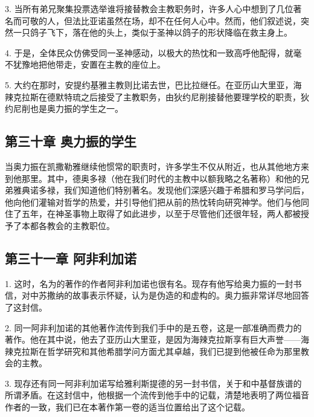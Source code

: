 3. 当所有弟兄聚集投票选举谁将接替教会主教职务时，许多人心中想到了几位著名而可敬的人，但法比亚诺虽然在场，却不在任何人心中。然而，他们叙述说，突然一只鸽子飞下，落在他的头上，类似于圣神以鸽子的形状降临在救主身上。\par

4. 于是，全体民众仿佛受同一圣神感动，以极大的热忱和一致高呼他配得，就毫不犹豫地把他带走，安置在主教的座位上。\par

5. 大约在那时，安提约基雅主教则比诺去世，巴比拉继任。在亚历山大里亚，海辣克拉斯在德默特琉之后接受了主教职务，由狄约尼削接替他要理学校的职责，狄约尼削也是奥力振的学生之一。\par


\subsection{第三十章  奥力振的学生}

当奥力振在凯撒勒雅继续他惯常的职责时，许多学生不仅从附近，也从其他地方来到他那里。其中，德奥多禄（他在我们时代的主教中以额我略之名著称）和他的兄弟雅典诺多禄，我们知道他们特别著名。发现他们深感兴趣于希腊和罗马学问后，他向他们灌输对哲学的热爱，并引导他们把从前的热忱转向研究神学。他们与他同住了五年，在神圣事物上取得了如此进步，以至于尽管他们还很年轻，两人都被授予了本都各教会的主教职位。\par


\subsection{第三十一章  阿非利加诺}

1. 这时，名为的著作的作者阿非利加诺也很有名。现存有他写给奥力振的一封书信，对中苏撒纳的故事表示怀疑，认为是伪造的和虚构的。奥力振非常详尽地回答了这封信。\par

2. 同一阿非利加诺的其他著作流传到我们手中的是五卷，这是一部准确而费力的著作。他在其中说，他去了亚历山大里亚，是因为海辣克拉斯享有巨大声誉——海辣克拉斯在哲学研究和其他希腊学问方面尤其卓越，我们已提到他被任命为那里教会的主教。\par

3. 现存还有同一阿非利加诺写给雅利斯提德的另一封书信，关于和中基督族谱的所谓矛盾。在这封信中，他根据一个流传到他手中的记载，清楚地表明了两位福音作者的一致，我们已在本著作第一卷的适当位置给出了这个记载。\par

